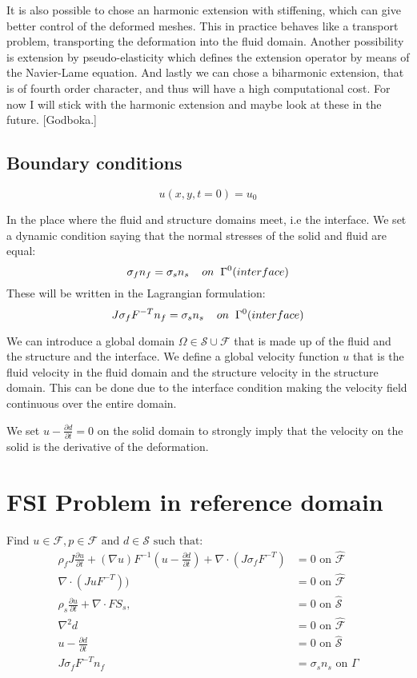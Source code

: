 It is also possible to chose an harmonic extension with stiffening, which can give better control of the deformed meshes. This in practice behaves like a transport problem, transporting the deformation into the fluid domain. Another possibility is extension by pseudo-elasticity which defines the extension operator by means of the Navier-Lame equation. And lastly we can chose a biharmonic extension, that is of fourth order character, and thus will have a high computational cost. For now I will stick with the harmonic extension and maybe look at these in the future. [Godboka.]

\subsection*{Boundary conditions}
$$  u(x,y,t=0) = u_0   $$

In the place where the fluid and structure domains meet, i.e the interface. We set a dynamic condition saying that the normal stresses of the solid and fluid are equal:
$$  \sigma_f n_f = \sigma_s n_s \hspace{4mm} on  \hspace{2mm}\Gamma^0 (interface)   $$
These will be written in the Lagrangian formulation:
$$  J\sigma_f F^{-T} n_f = \sigma_s  n_s \hspace{4mm} on  \hspace{2mm}\Gamma^0 (interface)   $$

We can introduce a global domain $\Omega \in \mathcal{S} \cup \mathcal{F} $ that is made up of the fluid and the structure and the interface. We define a global velocity function $u$ that is the fluid velocity in the fluid domain and the structure velocity in the structure domain. This can be done due to the interface condition making the velocity field continuous over the entire domain.  

We  set $u- \frac{\partial d}{\partial t}  = 0  $ on the solid domain to strongly imply that the velocity on the solid is the derivative of the deformation.  

\section*{FSI Problem in reference domain}
Find $u \in \mathcal{F} , p \in \mathcal{F} \text{  and  } d \in \mathcal{S} \text{  such that}:$ 
\begin{align}
\rho_f J \frac{\partial u}{\partial t} + (\nabla u)F^{-1}(u-\frac{\partial d}{\partial t})  + \nabla \cdot( J\sigma_f F^{-T})  &= 0 \text{  on  } \mathcal{\hat{F} } \\
\nabla \cdot (J u F^{-T})\big) &= 0 \text{  on  } \mathcal{\hat{F}}   \\
\rho_s \frac{\partial u}{\partial t} + \nabla \cdot F S_s,&=0  \text{  on  } \mathcal{\hat{S}}\\
\nabla^2 d &= 0  \text{  on  } \mathcal{\hat{F}}\\
u- \frac{\partial d}{\partial t}  &= 0  \text{  on  } \mathcal{\hat{S}}\\
J\sigma_f F^{-T} n_f &= \sigma_s  n_s \text{  on  } \Gamma
\end{align}



